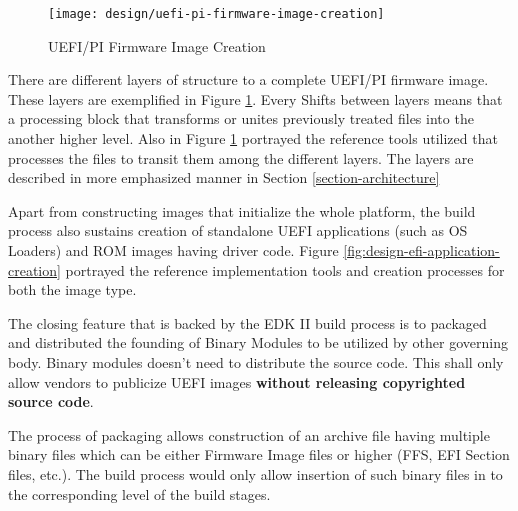 \begin{figure}[!htbp]
  \centering
  \texttt{[image: design/uefi-pi-firmware-image-creation]}
  \caption{UEFI/PI Firmware Image Creation}\label{fig:design-uefi-pi-firmware-image-creation}
\end{figure}
There are different layers of structure to a complete UEFI/PI firmware image. These layers are exemplified in Figure \ref{fig:design-uefi-pi-firmware-image-creation}. Every Shifts between layers means that a processing block that transforms or unites previously treated files into the another higher level. Also in Figure \ref{fig:design-uefi-pi-firmware-image-creation} portrayed the reference tools utilized that processes the files to transit them among the different layers. The layers are described in more emphasized manner in Section \ref{section-architecture}

Apart from constructing images that initialize the whole platform, the build process also sustains creation of standalone UEFI applications (such as OS Loaders) and ROM images having driver code. Figure \ref{fig:design-efi-application-creation} portrayed the reference implementation tools and creation processes for both the image type.

The closing feature that is backed by the EDK II build process is to packaged and distributed the founding of Binary Modules to be utilized by other governing body. Binary modules doesn't need to distribute the source code. This shall only allow vendors to publicize UEFI images \textbf{without releasing copyrighted source code}.

The process of packaging allows construction of an archive file having multiple binary files which can be either Firmware Image files or higher (FFS, EFI Section files, etc.). The build process would only allow insertion of such binary files in to the corresponding level of the build stages.

